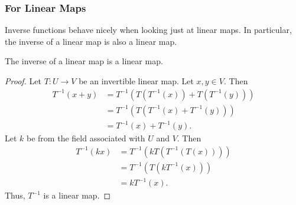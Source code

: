 \subsubsection{For Linear Maps}
Inverse functions behave nicely when looking just at linear maps.
In particular, the inverse of a linear map is also a linear map.

\begin{theorem}
	The inverse of a linear map is a linear map.
\end{theorem}
\begin{proof}
	Let $T: U \to V$ be an invertible linear map.
	Let $x,y \in V$.
	Then
	\begin{align*}
		T^{-1}(x + y) &= T^{-1}\left(T(T^{-1}(x)) + T(T^{-1}(y))\right) \\
		&= T^{-1}(T(T^{-1}(x) + T^{-1}(y))) \\
		&= T^{-1}(x) + T^{-1}(y).
	\end{align*}
	Let $k$ be from the field associated with $U$ and $V$.
	Then
	\begin{align*}
		T^{-1}(kx) &= T^{-1}(k T(T^{-1}(T(x))) ) \\
		&= T^{-1}(T(k T^{-1}(x))) \\
		&= kT^{-1}(x).
	\end{align*}
	Thus, $T^{-1}$ is a linear map.
\end{proof}
